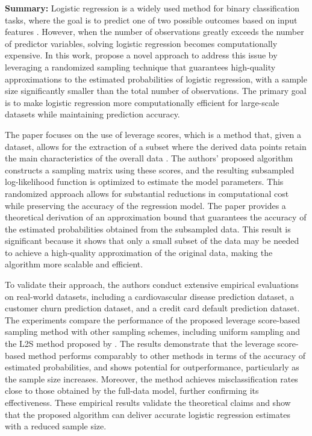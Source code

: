 \documentclass{article}
\theoremstyle{plain}
\theoremstyle{definition}
\theoremstyle{remark}
\begin{document}
\textbf{Summary:} Logistic regression is a widely used method for binary classification tasks, where the goal is to predict one of two possible outcomes based on input features \cite{pml}. However, when the number of observations greatly exceeds the number of predictor variables, solving logistic regression becomes computationally expensive. In this work, \citeauthor{chow24} propose a novel approach to address this issue by leveraging a randomized sampling technique that guarantees high-quality approximations to the estimated probabilities of logistic regression, with a sample size significantly smaller than the total number of observations. The primary goal is to make logistic regression more computationally efficient for large-scale datasets while maintaining prediction accuracy.

The paper focuses on the use of leverage scores, which is a method that, given a dataset, allows for the extraction of a subset where the derived data points retain the main characteristics of the overall data \cite{ordo22}. The authors' proposed algorithm constructs a sampling matrix using these scores, and the resulting subsampled log-likelihood function is optimized to estimate the model parameters. This randomized approach allows for substantial reductions in computational cost while preserving the accuracy of the regression model.
The paper provides a theoretical derivation of an approximation bound that guarantees the accuracy of the estimated probabilities obtained from the subsampled data. This result is significant because it shows that only a small subset of the data may be needed to achieve a high-quality approximation of the original data, making the algorithm more scalable and efficient.

To validate their approach, the authors conduct extensive empirical evaluations on real-world datasets, including a cardiovascular disease prediction dataset, a customer churn prediction dataset, and a credit card default prediction dataset. The experiments compare the performance of the proposed leverage score-based sampling method with other sampling schemes, including uniform sampling and the L2S method proposed by \citeauthor{mun18}. The results demonstrate that the leverage score-based method performs comparably to other methods in terms of the accuracy of estimated probabilities, and shows potential for outperformance, particularly as the sample size increases. Moreover, the method achieves misclassification rates close to those obtained by the full-data model, further confirming its effectiveness. These empirical results validate the theoretical claims and show that the proposed algorithm can deliver accurate logistic regression estimates with a reduced sample size.
\end{document}
